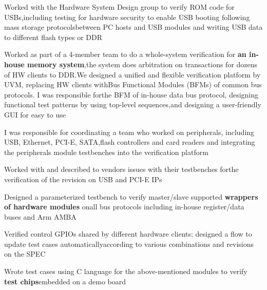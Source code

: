 \documentclass[letterpaper,11pt]{article}
\newcommand{\resumeItem}[1]{
  \item\small{
    {#1 \vspace{-0.5pt}}
  }
}
\begin{document}
            \resumeItem{Worked with the Hardware System Design group to verify ROM code for USBs,\newline including testing for hardware security to enable USB booting following mass storage protocols\newline between PC hosts and USB modules and writing USB data to different flash types or DDR}
            
            \resumeItem{Worked as part of a 4-member team to do a whole-system verification for \textbf{an in-house memory system},\newline the system does arbitration on transactions for dozens of HW clients to DDR.\newline We designed a unified and flexible verification platform by UVM, replacing HW clients with\newline Bus Functional Modules (BFMs) of common bus protocols. I was responsible for\newline the BFM of in-house data bus protocol, designing functional test patterns by using top-level sequences,\newline and designing a user-friendly GUI for easy to use}
            
            \resumeItem{I was responsible for coordinating a team who worked on peripherals, including USB, Ethernet, PCI-E, SATA,\newline flash controllers and card readers and integrating the peripherals module testbenches into the verification platform}

            \resumeItem{Worked with and described to vendors issues with their testbenches for\newline the verification of the revision on USB and PCI-E IPs}
            
            \resumeItem{Designed a parameterized testbench to verify master/slave supported \textbf{wrappers of hardware modules} on\newline all bus protocols including in-house register/data buses and Arm AMBA}
            
            \resumeItem{Verified control GPIOs shared by different hardware clients; designed a flow to update test cases automatically\newline according to various combinations and revisions on the SPEC}
            
            \resumeItem{Wrote test cases using C language for the above-mentioned modules to verify \textbf{test chips}\newline embedded on a demo board}
            
\end{document}
